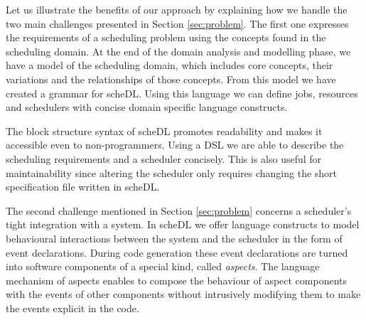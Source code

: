 	Let us illustrate the benefits of our approach by explaining how we handle the
	two main challenges presented in Section \ref{sec:problem}.
	The first one expresses the requirements of a scheduling problem
	using the concepts found in the scheduling domain. At the end of the domain
	analysis and modelling phase, we have a model of the scheduling domain, which
	includes core concepts, their variations and the relationships of those concepts.  From this
	model we have created a grammar for \textsf{scheDL}. Using this language we can define \textsf{job}s,
	\textsf{resource}s and \textsf{scheduler}s with concise domain specific language
	constructs.
	
	The block structure syntax of \textsf{scheDL} promotes readability and
	makes it accessible even to non-programmers. Using a DSL we are able to describe
	the scheduling requirements and a scheduler concisely. This is also useful for
	maintainability since altering the scheduler only requires changing the short specification file written in \textsf{scheDL}.
	
	The second challenge mentioned in Section \ref{sec:problem} concerns a
	scheduler's tight integration with a system. In \textsf{scheDL} we offer
	language constructs to model behavioural interactions between the system and the
	scheduler in the form of event declarations. During code generation these event
	declarations are turned into software components of a special kind, called
	\emph{aspects}. The language mechanism of aspects enables to compose the
	behaviour of aspect components with the events of other components without
	intrusively modifying them to make the events explicit in the code.
	
